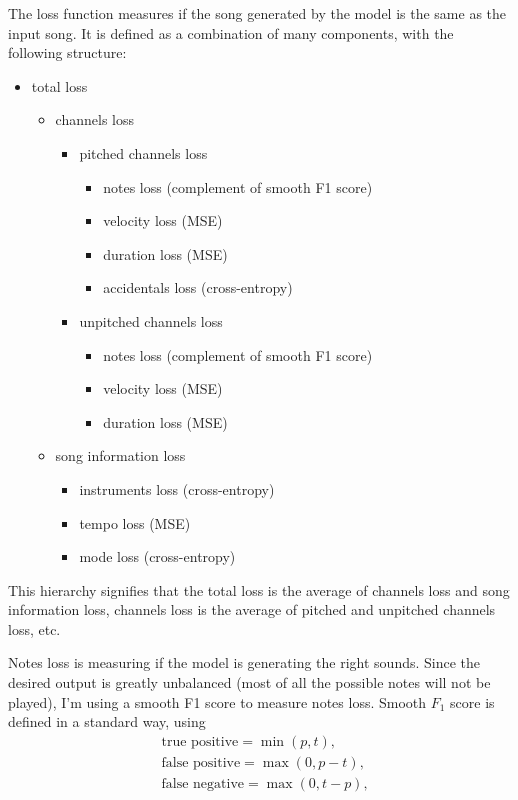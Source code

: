 \documentclass[en]{pracamgr}
\begin{document}
The loss function measures if the song generated by the model is the same as the input song. It is defined as a combination of many components, with the following structure:
\begin{itemize}
    \item total loss
	\begin{itemize}
	    \item channels loss
		\begin{itemize}
			\item pitched channels loss
            \begin{itemize}
                \item notes loss (complement of smooth F1 score)
                \item velocity loss (MSE)
                \item duration loss (MSE)
                \item accidentals loss (cross-entropy)
            \end{itemize}
			\item unpitched channels loss
            \begin{itemize}
                \item notes loss (complement of smooth F1 score)
                \item velocity loss (MSE)
                \item duration loss (MSE)
            \end{itemize}
		\end{itemize}
        \item song information loss
        \begin{itemize}
            \item instruments loss (cross-entropy)
            \item tempo loss (MSE)
            \item mode loss (cross-entropy)
        \end{itemize}
	\end{itemize}
\end{itemize}

This hierarchy signifies that the total loss is the average of channels loss and song information loss, channels loss is the average of pitched and unpitched channels loss, etc.

Notes loss is measuring if the model is generating the right sounds.
Since the desired output is greatly unbalanced (most of all the possible notes will not be played), I'm using a smooth F1 score to measure notes loss.
Smooth $F_1$ score is defined in a standard way, using
\nopagebreak
\begin{align}
    & \textrm{true positive} = \min(p, t), \\
    & \textrm{false positive} = \max(0, p - t), \\
    & \textrm{false negative} = \max(0, t - p),
\end{align}
\end{document}
